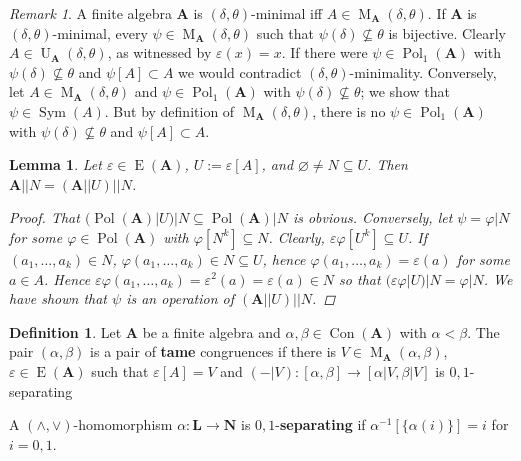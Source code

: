 \documentclass{amsart}
\theoremstyle{plain}
\newtheorem{lemma}[theorem]{Lemma}
\theoremstyle{definition}
\newtheorem{definition}[theorem]{Definition}
\theoremstyle{remark}
\newtheorem{remark}[theorem]{Remark}
\def\phi{\varphi}
\def\epsilon{\varepsilon}
\DeclareMathOperator{\Con}{Con}
\DeclareMathOperator{\Pol}{Pol}
\DeclareMathOperator{\Sym}{Sym}
\DeclareMathOperator{\Id}{E}
\DeclareMathOperator{\U}{U}
\DeclareMathOperator{\M}{M}
\begin{document}
\begin{remark}
    A finite algebra $\mathbf{A}$ is $(\delta, \theta)$-minimal iff $A \in \M_{\mathbf{A}}(\delta, \theta)$. 
    If $\mathbf{A}$ is $(\delta, \theta)$-minimal, every $\psi \in \M_{\mathbf{A}}(\delta, \theta)$ such that $\psi(\delta) \nsubseteq \theta$ is bijective. 
    Clearly $A \in \U_{\mathbf{A}}(\delta, \theta)$, as witnessed by $\epsilon(x)=x$. 
    If there were $\psi \in \Pol_1(\mathbf{A})$ with $\psi(\delta) \nsubseteq \theta$ and $\psi[A] \subset A$ we would contradict $(\delta, \theta)$-minimality. 
    Conversely, let $A \in \M_{\mathbf{A}}(\delta, \theta)$ and $\psi \in \Pol_1(\mathbf{A})$ with $\psi(\delta) \nsubseteq \theta$; 
    we show that $\psi \in \Sym(A)$. 
    But by definition of $\M_{\mathbf{A}}(\delta, \theta)$, there is no $\psi \in \Pol_1(\mathbf{A})$ with $\psi(\delta) \nsubseteq \theta$ and $\psi[A] \subset A$. 
\end{remark}


\begin{lemma}
    \label{lemma_ex}
    Let $\epsilon \in \Id(\mathbf{A})$, $U:=\epsilon[A]$, and $\varnothing \neq N \subseteq U$.  
    Then $\mathbf{A}||N = (\mathbf{A}||U)||N$. 
    \begin{proof}
        That $(\Pol(\mathbf{A})|U)|N \subseteq \Pol(\mathbf{A})|N$ is obvious. 
        Conversely, let $\psi=\phi|N$ for some $\phi \in \Pol(\mathbf{A})$ with $\phi[N^k] \subseteq N$. 
        Clearly, $\epsilon \phi [U^k] \subseteq U$. 
        If $(a_1, \ldots, a_k) \in N$, $\phi(a_1, \ldots, a_k) \in N \subseteq U$, hence $\phi(a_1, \ldots, a_k) = \epsilon(a)$ for some $a \in A$. 
        Hence $\epsilon \phi(a_1, \ldots, a_k) = \epsilon^2(a)=\epsilon(a) \in N$ so that $(\epsilon \phi |U )|N = \phi|N$. 
        We have shown that $\psi$ is an operation of $(\mathbf{A}||U)||N$. 
    \end{proof}
\end{lemma}

\begin{definition}
    Let $\mathbf{A}$ be a finite algebra and $\alpha, \beta \in \Con(\mathbf{A})$ with $\alpha < \beta$. 
    The pair $(\alpha, \beta)$ is a pair of \textbf{tame} congruences if there is $V \in \M_{\mathbf{A}}(\alpha, \beta)$, $\epsilon \in \Id(\mathbf{A})$ such that $\epsilon[A]=V$ and 
    $(-|V): [\alpha, \beta] \to [\alpha|V, \beta|V]$ is $0,1$-separating
    
    A $(\land, \lor)$-homomorphism $\alpha: \mathbf{L} \to \mathbf{N}$ is $0,1$-\textbf{separating} if $\alpha^{-1}[\{\alpha(i)\}]=i$ for $i=0,1$. 
\end{definition}
\end{document}
